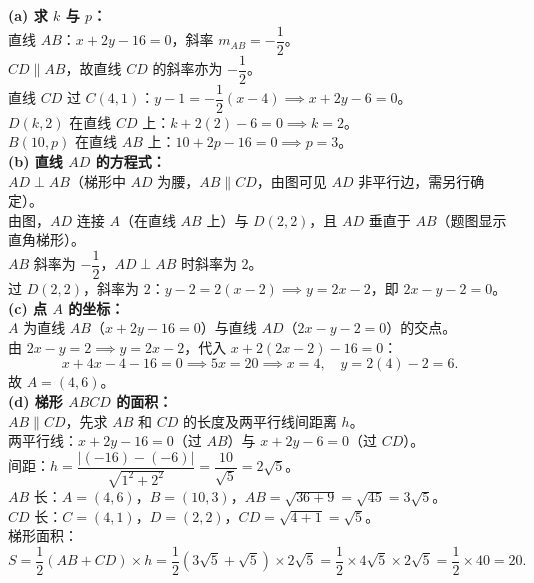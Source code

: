 \documentclass[12pt,a4paper]{ctexart}
\newenvironment{solution}
  {%
    \par\noindent
  }
  {\par}
\begin{document}
\begin{solution}
    \textbf{(a) 求 $k$ 与 $p$：} \\
    直线 $AB$：$x+2y-16=0$，斜率 $m_{AB} = -\dfrac{1}{2}$。\\
    $CD \parallel AB$，故直线 $CD$ 的斜率亦为 $-\dfrac{1}{2}$。\\
    直线 $CD$ 过 $C(4,1)$：$y-1 = -\dfrac{1}{2}(x-4) \implies x+2y-6=0$。\\
    $D(k,2)$ 在直线 $CD$ 上：$k + 2(2) - 6 = 0 \implies k = 2$。\\
    $B(10,p)$ 在直线 $AB$ 上：$10 + 2p - 16 = 0 \implies p = 3$。\\

    \textbf{(b) 直线 $AD$ 的方程式：} \\
    $AD \perp AB$（梯形中 $AD$ 为腰，$AB \parallel CD$，由图可见 $AD$ 非平行边，需另行确定）。\\
    由图，$AD$ 连接 $A$（在直线 $AB$ 上）与 $D(2,2)$，且 $AD$ 垂直于 $AB$（题图显示直角梯形）。\\
    $AB$ 斜率为 $-\dfrac{1}{2}$，$AD \perp AB$ 时斜率为 $2$。\\
    过 $D(2,2)$，斜率为 $2$：$y-2 = 2(x-2) \implies y = 2x-2$，即 $2x-y-2=0$。\\

    \textbf{(c) 点 $A$ 的坐标：} \\
    $A$ 为直线 $AB$（$x+2y-16=0$）与直线 $AD$（$2x-y-2=0$）的交点。\\
    由 $2x-y=2 \implies y=2x-2$，代入 $x+2(2x-2)-16=0$：
    \[
        x+4x-4-16=0 \implies 5x=20 \implies x=4,\quad y=2(4)-2=6.
    \]
    故 $A = (4,6)$。\\

    \textbf{(d) 梯形 $ABCD$ 的面积：} \\
    $AB \parallel CD$，先求 $AB$ 和 $CD$ 的长度及两平行线间距离 $h$。\\
    两平行线：$x+2y-16=0$（过 $AB$）与 $x+2y-6=0$（过 $CD$）。\\
    间距：$h = \dfrac{|(-16)-(-6)|}{\sqrt{1^2+2^2}} = \dfrac{10}{\sqrt{5}} = 2\sqrt{5}$。\\
    $AB$ 长：$A=(4,6)$，$B=(10,3)$，$AB = \sqrt{36+9} = \sqrt{45} = 3\sqrt{5}$。\\
    $CD$ 长：$C=(4,1)$，$D=(2,2)$，$CD = \sqrt{4+1} = \sqrt{5}$。\\
    梯形面积：
    \[
        S = \frac{1}{2}(AB+CD)\times h = \frac{1}{2}(3\sqrt{5}+\sqrt{5})\times 2\sqrt{5}
        = \frac{1}{2}\times 4\sqrt{5}\times 2\sqrt{5} = \frac{1}{2}\times 40 = 20.
    \]
\end{solution}
\end{document}
